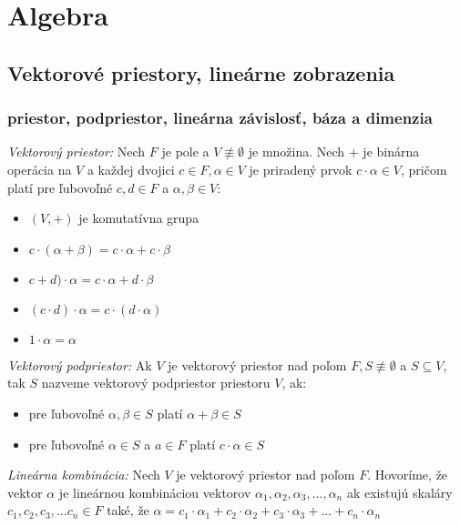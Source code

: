 \chapter[Algebra]{Algebra}

\label{algebra} %

\section{Vektorové priestory, lineárne zobrazenia}
\subsection{priestor, podpriestor, lineárna závislosť, báza a dimenzia}
\emph{Vektorový priestor:} Nech $F$ je pole a $V \not\equiv \emptyset$ je množina. Nech $+$ je binárna operácia na $V$ a každej dvojici $c \in F, \alpha \in V$ je priradený prvok $c \cdot \alpha \in V$, pričom platí pre ľubovoľné $c, d \in F$ a $\alpha, \beta \in V$:
\begin{itemize}
    \item $(V, +)$ je komutatívna grupa
    \item $c \cdot (\alpha + \beta) = c \cdot \alpha + c \cdot \beta$
    \item $c + d)\cdot\alpha = c\cdot\alpha + d\cdot\beta $
    \item $(c \cdot d)\cdot\alpha = c \cdot (d\cdot\alpha)$
    \item $1\cdot\alpha = \alpha$
\end{itemize}

\bigskip

\emph{Vektorový podpriestor:} Ak $V$ je vektorový priestor nad poľom $F, S \not\equiv \emptyset$ a $S \subseteq V$, tak $S$ nazveme vektorový podpriestor priestoru $V$, ak:
\begin{itemize}
    \item pre ľubovoľné $\alpha, \beta \in S$ platí $\alpha + \beta \in S$
    \item pre ľubovoľné $\alpha \in S$ a $a \in F$ platí $c \cdot \alpha \in S$
\end{itemize}  

\bigskip

\emph{Lineárna kombinácia:} Nech $V$ je vektorový priestor nad poľom $F$. Hovoríme, že vektor $\alpha$ je lineárnou kombináciou vektorov 
$\alpha_1, \alpha_2, \alpha_3, ... , \alpha_n$ ak existujú skaláry $c_1, c_2, c_3, ... c_n \in F$ také, že 
$\alpha = c_1 \cdot \alpha_1 + c_2 \cdot \alpha_2 + c_3 \cdot \alpha_3 + ... + c_n \cdot \alpha_n$

